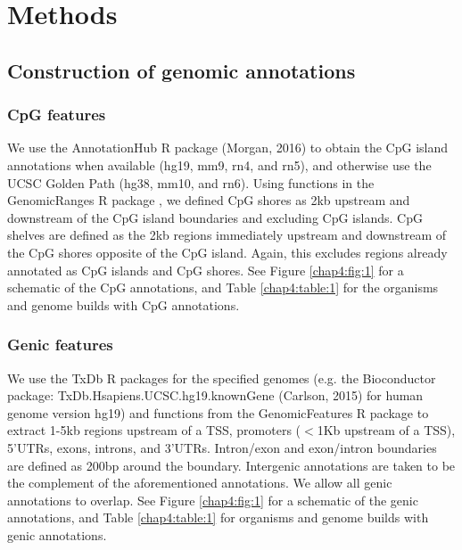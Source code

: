 \section{Methods}
\label{annotatr_methods}

\subsection{Construction of genomic annotations}
\label{annotatr_methods_construction}

\subsubsection{CpG features}
We use the AnnotationHub R package (Morgan, 2016) to obtain the CpG island annotations when available (hg19, mm9, rn4, and rn5), and otherwise use the UCSC Golden Path (hg38, mm10, and rn6). Using functions in the GenomicRanges R package \cite{Lawrence:2013hi}, we defined CpG shores as 2kb upstream and downstream of the CpG island boundaries and excluding CpG islands. CpG shelves are defined as the 2kb regions immediately upstream and downstream of the CpG shores opposite of the CpG island. Again, this excludes regions already annotated as CpG islands and CpG shores. See Figure \ref{chap4:fig:1} for a schematic of the CpG annotations, and Table \ref{chap4:table:1} for the organisms and genome builds with CpG annotations.

\subsubsection{Genic features}
We use the TxDb R packages for the specified genomes (e.g. the Bioconductor package: TxDb.Hsapiens.UCSC.hg19.knownGene (Carlson, 2015) for human genome version hg19) and functions from the GenomicFeatures R package \cite{Lawrence:2013hi} to extract 1-5kb regions upstream of a TSS, promoters ($<$1Kb upstream of a TSS), 5'UTRs, exons, introns, and 3'UTRs. Intron/exon and exon/intron boundaries are defined as 200bp around the boundary. Intergenic annotations are taken to be the complement of the aforementioned annotations. We allow all genic annotations to overlap. See Figure \ref{chap4:fig:1} for a schematic of the genic annotations, and Table \ref{chap4:table:1} for organisms and genome builds with genic annotations.

